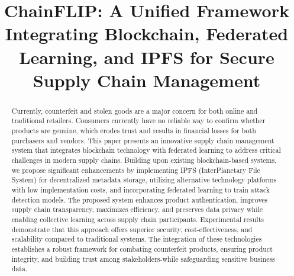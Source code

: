 \documentclass[conference]{IEEEtran}
\begin{document}
\title{ChainFLIP: A Unified Framework Integrating Blockchain, Federated Learning, and IPFS for Secure Supply Chain Management}



\maketitle

\begin{abstract}
Currently, counterfeit and stolen goods are a major concern for both online and traditional retailers. Consumers currently have no reliable way to confirm whether products are genuine, which erodes trust and results in financial losses for both purchasers and vendors. This paper presents an innovative supply chain management system that integrates blockchain technology with federated learning to address critical challenges in modern supply chains. Building upon existing blockchain-based systems, we propose significant enhancements by implementing IPFS (InterPlanetary File System) for decentralized metadata storage, utilizing alternative technology platforms with low implementation costs, and incorporating federated learning to train attack detection models. The proposed system enhances product authentication, improves supply chain transparency, maximizes efficiency, and preserves data privacy while enabling collective learning across supply chain participants. Experimental results demonstrate that this approach offers superior security, cost-effectiveness, and scalability compared to traditional systems. The integration of these technologies establishes a robust framework for combating counterfeit products, ensuring product integrity, and building trust among stakeholders-while safeguarding sensitive business data.
\end{abstract}
\end{document}
